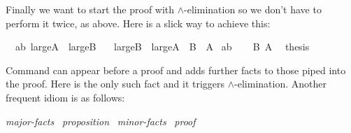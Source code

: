 \begin{isabellebody}
\begin{isamarkuptext}
Finally we want to start the proof with $\land$-elimination so we
don't have to perform it twice, as above. Here is a slick way to
achieve this:%
\end{isamarkuptext}%
\isamarkuptrue%
\isamarkupfalse%
\ \ ab{\isacharcolon}\ {\isachardoublequoteopen}large{\isacharunderscore}A\ {\isasymand}\ large{\isacharunderscore}B{\isachardoublequoteclose}\isanewline
\ \ \ {\isachardoublequoteopen}large{\isacharunderscore}B\ {\isasymand}\ large{\isacharunderscore}A{\isachardoublequoteclose}\ {\isacharparenleft}\ {\isachardoublequoteopen}{\isacharquery}B\ {\isasymand}\ {\isacharquery}A{\isachardoublequoteclose}{\isacharparenright}\isanewline
%
\isadelimproof
%
\endisadelimproof
%
\isatagproof
{}\isamarkupfalse%
\ ab\isanewline
{}\isamarkupfalse%
\isanewline
\ \ \isamarkupfalse%
\ {\isachardoublequoteopen}{\isacharquery}B{\isachardoublequoteclose}\ {\isachardoublequoteopen}{\isacharquery}A{\isachardoublequoteclose}\ \isamarkupfalse%
\ {\isacharquery}thesis\ \isacommand{{\isachardot}{\isachardot}}\isamarkupfalse%
\isanewline
{}\isamarkupfalse%
%
\endisatagproof
{\isafoldproof}%
%
\isadelimproof
%
\endisadelimproof
%
\begin{isamarkuptext}%
\noindent Command  can appear before a proof
and adds further facts to those piped into the proof. Here 
is the only such fact and it triggers $\land$-elimination. Another
frequent idiom is as follows:
\begin{center}
 \emph{major-facts}~
 \emph{proposition}~
 \emph{minor-facts}~
\emph{proof}
\end{center}


\end{isamarkuptext}
\end{isabellebody}
